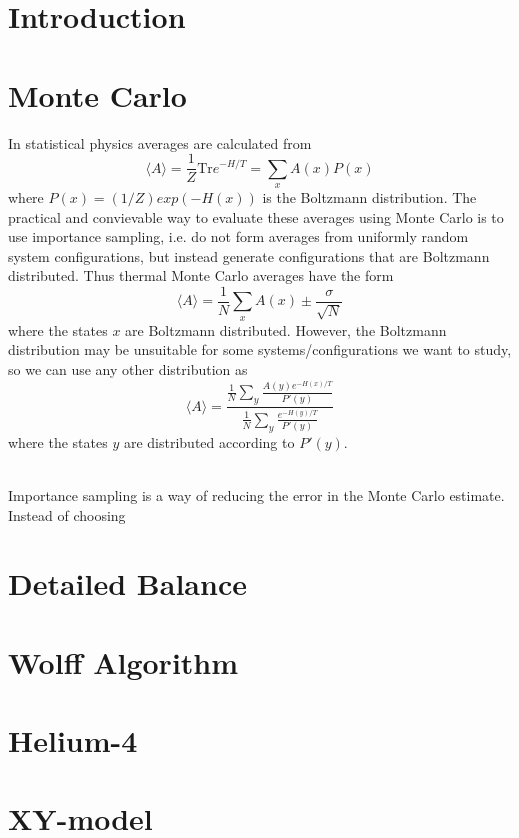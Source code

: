 \documentclass[a4paper]{article}
\newcommand{\trm}[1]{\textrm{#1}}
\begin{document}
\section{Introduction}
\section{Monte Carlo}
In statistical physics averages are calculated from 
\begin{equation}
  \langle A\rangle = \frac{1}{Z}\trm{Tr} e^{-H/T} = \sum_x A(x) P(x)
  \label{}
\end{equation}
where  $P(x) = (1/Z)exp(-H(x))$ is the Boltzmann distribution.
The practical and convievable way to evaluate these averages using Monte Carlo is to use importance sampling, i.e. do not form averages from uniformly random system configurations, but instead generate configurations that are Boltzmann distributed.   
Thus thermal Monte Carlo averages have the form 
\begin{equation}
  \langle A \rangle = \frac{1}{N} \sum_x A(x) \pm \frac{\sigma	}{\sqrt N}
  \label{}
\end{equation}
where the states $x$ are Boltzmann distributed.
However, the Boltzmann distribution may be unsuitable for some systems/configurations we want to study, so we can use any other distribution as 
\begin{equation}
  \langle A \rangle = \frac{\frac{1}{N}\sum_y \frac{A(y) e^{-H(x)/T}}{P'(y)}}{\frac{1}{N}\sum_y \frac{e^{-H(y)/T}}{P'(y)}}  
  \label{}
\end{equation}
 where the states $y$ are distributed according to $P'(y)$.

 \\
 Importance sampling is a way of reducing the error in the Monte Carlo estimate. Instead of choosing 
\section{Detailed Balance}
\section{Wolff Algorithm}

\section{Helium-4}
\section{XY-model}
\end{document}
